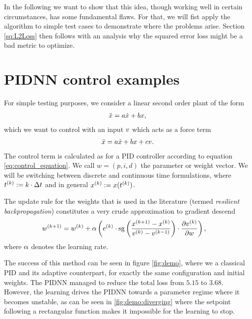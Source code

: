 \documentclass{article}
\begin{document}
    In the following we want to show that this idea, though working well in certain circumstances, 
    has some fundamental flaws. For that, we will fist apply the algorithm to simple test cases to 
    demonstrate where the problems arise. Section \ref{sq:L2Loss} then follows with an analysis why 
    the squared error loss might be a bad metric to optimize. 






  \section{PIDNN control examples}
    For simple testing purposes, we  consider a linear second order plant of the form
    \begin{align}
        \ddot{x} = a \dot{x} + b x,
    \end{align}
    which we want to control with an input $v$ which acts as a force term
    \begin{align}
        \ddot{x} = a \dot{x} + b x + c v. \label{eq:qe_of_motion_system}
    \end{align}
    The control term is calculated as for a PID controller according to equation \eqref{eq:control_equation}. 
    We call $w = (p, i, d)$ the parameter or weight vector. 
    We will be switching between discrete and continuous time formulations, 
    where ${t}^{(k)} := k \cdot \Delta t$ and in general ${x}^{(k)} := x({t}^{(k)})$.


    The update rule for the weights that is used in the literature \cite{cong_novel_2005} 
    (termed \emph{resilient backpropagation}) constitutes a very crude approximation to gradient descend
    \begin{align}
        {w}^{(k+1)} &= {w}^{(k)} + \alpha \left( {e}^{(k)} \cdot 
                        \operatorname{sg} \left(\frac{{x}^{(k+1)} - {x}^{(k)}}{{v}^{(k)} 
                        - {v}^{(k-1)}}\right) \cdot 
                        \frac{\partial {v}^{(k)}}{\partial w}\right), \label{eq:diffq_pidnn}
    \end{align}
    where $\alpha$ denotes the learning rate. 

    The success of this method can be seen in figure \ref{fig:demo}, where we a classical PID 
    and its adaptive counterpart, for exactly the same configuration and initial weights. 
    The PIDNN managed to reduce the total loss from $5.15$ to $3.68$. However, the learning drives the PIDNN towards a 
    parameter regime where it becomes unstable, as can be seen in \ref{fig:demo:diverging} where the setpoint following 
    a rectangular function makes it impossible for the learning to stop. 
\end{document}
